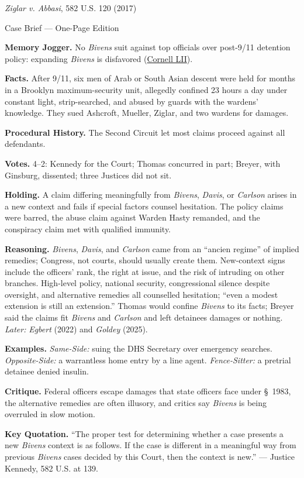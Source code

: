 \documentclass[12pt]{article}
\begin{document}
\begin{center}
{\Large \textit{Ziglar v. Abbasi}, 582 U.S. 120 (2017)\par}
\vspace{0.3em}
{\normalsize Case Brief --- One-Page Edition\par}
\end{center}

\textbf{Memory Jogger.} No \textit{Bivens} suit against top officials over post-9/11 detention policy: expanding \textit{Bivens} is disfavored (\href{https://www.law.cornell.edu/supremecourt/text/15-1358}{Cornell LII}).

\textbf{Facts.} After 9/11, six men of Arab or South Asian descent were held for months in a Brooklyn maximum-security unit, allegedly confined 23 hours a day under constant light, strip-searched, and abused by guards with the wardens' knowledge. They sued Ashcroft, Mueller, Ziglar, and two wardens for damages.

\textbf{Procedural History.} The Second Circuit let most claims proceed against all defendants.

\textbf{Votes.} 4--2: Kennedy for the Court; Thomas concurred in part; Breyer, with Ginsburg, dissented; three Justices did not sit.

\textbf{Holding.} A claim differing meaningfully from \textit{Bivens}, \textit{Davis}, or \textit{Carlson} arises in a new context and fails if special factors counsel hesitation. The policy claims were barred, the abuse claim against Warden Hasty remanded, and the conspiracy claim met with qualified immunity.

\textbf{Reasoning.} \textit{Bivens}, \textit{Davis}, and \textit{Carlson} came from an ``ancien regime'' of implied remedies; Congress, not courts, should usually create them. New-context signs include the officers' rank, the right at issue, and the risk of intruding on other branches. High-level policy, national security, congressional silence despite oversight, and alternative remedies all counselled hesitation; ``even a modest extension is still an extension.'' Thomas would confine \textit{Bivens} to its facts; Breyer said the claims fit \textit{Bivens} and \textit{Carlson} and left detainees damages or nothing. \emph{Later:} \textit{Egbert} (2022) and \textit{Goldey} (2025).

\textbf{Examples.} \emph{Same-Side:} suing the DHS Secretary over emergency searches. \emph{Opposite-Side:} a warrantless home entry by a line agent. \emph{Fence-Sitter:} a pretrial detainee denied insulin.

\textbf{Critique.} Federal officers escape damages that state officers face under \S~1983, the alternative remedies are often illusory, and critics say \textit{Bivens} is being overruled in slow motion.

\textbf{Key Quotation.} ``The proper test for determining whether a case presents a new \textit{Bivens} context is as follows. If the case is different in a meaningful way from previous \textit{Bivens} cases decided by this Court, then the context is new.'' --- Justice Kennedy, 582 U.S. at 139.
\end{document}
